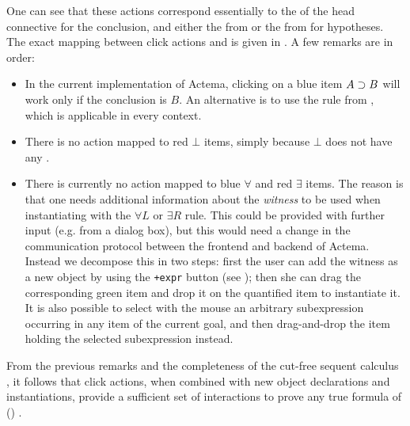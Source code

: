 One can see that these actions correspond essentially to the  of the head connective for the conclusion, and either the
 from  or the  from
 for hypotheses. The exact mapping between click actions and
 is given in . A few remarks are in
order:
\begin{itemize}
  \item In the current implementation of Actema, clicking on a blue item $A
  \supset B$ will work only if the conclusion is $B$. An alternative is to use the
  {} rule from , which is applicable in every
  context.
  \item There is no action mapped to red $\bot$ items, simply because $\bot$
  does not have any .
  \item There is currently no action mapped to blue $∀$ and red $∃$ items. The
  reason is that one needs additional information about the \emph{witness} to be
  used when instantiating with the $∀L$ or $∃R$ rule. This could be provided
  with further input (e.g. from a dialog box), but this would need a change in
  the communication protocol between the frontend and backend of Actema. Instead
  we decompose this in two steps: first the user can add the witness as a new
  object by using the \texttt{+expr} button (see ); then she
  can drag the corresponding green item and drop it on the quantified item to
  instantiate it. It is also possible to select with the mouse an arbitrary
  subexpression occurring in any item of the current goal, and then
  drag-and-drop the item holding the selected subexpression instead.
\end{itemize}

\begin{remark}\label{rem:click-completeness}
  From the previous remarks and the completeness of the cut-free sequent
  calculus , it follows that click actions, when combined with new
  object declarations and  instantiations, provide a sufficient set of
  interactions to prove any true formula of () .
\end{remark}

